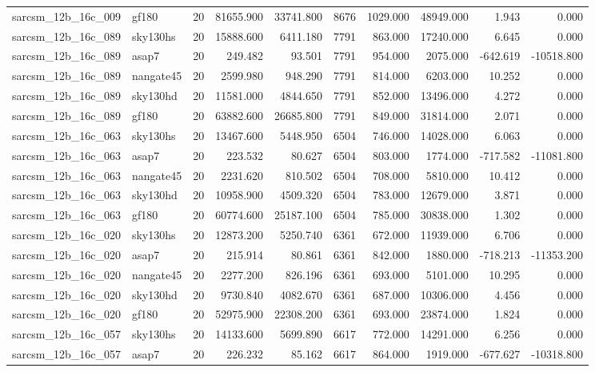\begin{longtable}{llrrrrrrrr}
sarcsm\_12b\_16c\_009 & gf180 & 20 & 81655.900 & 33741.800 & 8676 & 1029.000 & 48949.000 & 1.943 & 0.000 \\
sarcsm\_12b\_16c\_089 & sky130hs & 20 & 15888.600 & 6411.180 & 7791 & 863.000 & 17240.000 & 6.645 & 0.000 \\
sarcsm\_12b\_16c\_089 & asap7 & 20 & 249.482 & 93.501 & 7791 & 954.000 & 2075.000 & -642.619 & -10518.800 \\
sarcsm\_12b\_16c\_089 & nangate45 & 20 & 2599.980 & 948.290 & 7791 & 814.000 & 6203.000 & 10.252 & 0.000 \\
sarcsm\_12b\_16c\_089 & sky130hd & 20 & 11581.000 & 4844.650 & 7791 & 852.000 & 13496.000 & 4.272 & 0.000 \\
sarcsm\_12b\_16c\_089 & gf180 & 20 & 63882.600 & 26685.800 & 7791 & 849.000 & 31814.000 & 2.071 & 0.000 \\
sarcsm\_12b\_16c\_063 & sky130hs & 20 & 13467.600 & 5448.950 & 6504 & 746.000 & 14028.000 & 6.063 & 0.000 \\
sarcsm\_12b\_16c\_063 & asap7 & 20 & 223.532 & 80.627 & 6504 & 803.000 & 1774.000 & -717.582 & -11081.800 \\
sarcsm\_12b\_16c\_063 & nangate45 & 20 & 2231.620 & 810.502 & 6504 & 708.000 & 5810.000 & 10.412 & 0.000 \\
sarcsm\_12b\_16c\_063 & sky130hd & 20 & 10958.900 & 4509.320 & 6504 & 783.000 & 12679.000 & 3.871 & 0.000 \\
sarcsm\_12b\_16c\_063 & gf180 & 20 & 60774.600 & 25187.100 & 6504 & 785.000 & 30838.000 & 1.302 & 0.000 \\
sarcsm\_12b\_16c\_020 & sky130hs & 20 & 12873.200 & 5250.740 & 6361 & 672.000 & 11939.000 & 6.706 & 0.000 \\
sarcsm\_12b\_16c\_020 & asap7 & 20 & 215.914 & 80.861 & 6361 & 842.000 & 1880.000 & -718.213 & -11353.200 \\
sarcsm\_12b\_16c\_020 & nangate45 & 20 & 2277.200 & 826.196 & 6361 & 693.000 & 5101.000 & 10.295 & 0.000 \\
sarcsm\_12b\_16c\_020 & sky130hd & 20 & 9730.840 & 4082.670 & 6361 & 687.000 & 10306.000 & 4.456 & 0.000 \\
sarcsm\_12b\_16c\_020 & gf180 & 20 & 52975.900 & 22308.200 & 6361 & 693.000 & 23874.000 & 1.824 & 0.000 \\
sarcsm\_12b\_16c\_057 & sky130hs & 20 & 14133.600 & 5699.890 & 6617 & 772.000 & 14291.000 & 6.256 & 0.000 \\
sarcsm\_12b\_16c\_057 & asap7 & 20 & 226.232 & 85.162 & 6617 & 864.000 & 1919.000 & -677.627 & -10318.800 \\

\end{longtable}
